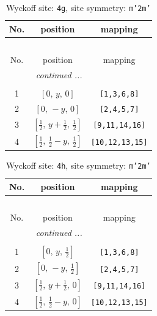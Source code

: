 \documentclass[fleqn,8pt]{jsarticle}
\begin{document}
\renewcommand{\arraystretch}{1.2}
\begin{longtable}{ccc}
\caption{Wyckoff site: {\tt 4g}, site symmetry: {\tt m'2m'}}
 \\
 \hline \hline
No. & position & mapping \\ \hline \endfirsthead

\multicolumn{2}{l}{\tablename\ \thetable{}} \\
 \hline \hline
No. & position & mapping \\ \hline \endhead

 \hline \hline
\multicolumn{2}{r}{\footnotesize\it continued ...} \\ \endfoot

 \hline \hline
\multicolumn{2}{r}{} \\ \endlastfoot

1 & $\left[ 0,\, y,\, 0 \right]$ & {\tt [1,3,6,8]} \\ \hline
2 & $\left[ 0,\, - y,\, 0 \right]$ & {\tt [2,4,5,7]} \\ \hline
3 & $\left[ \frac{1}{2},\, y + \frac{1}{2},\, \frac{1}{2} \right]$ & {\tt [9,11,14,16]} \\ \hline
4 & $\left[ \frac{1}{2},\, \frac{1}{2} - y,\, \frac{1}{2} \right]$ & {\tt [10,12,13,15]} \\
\end{longtable}
\renewcommand{\arraystretch}{1.2}
\begin{longtable}{ccc}
\caption{Wyckoff site: {\tt 4h}, site symmetry: {\tt m'2m'}}
 \\
 \hline \hline
No. & position & mapping \\ \hline \endfirsthead

\multicolumn{2}{l}{\tablename\ \thetable{}} \\
 \hline \hline
No. & position & mapping \\ \hline \endhead

 \hline \hline
\multicolumn{2}{r}{\footnotesize\it continued ...} \\ \endfoot

 \hline \hline
\multicolumn{2}{r}{} \\ \endlastfoot

1 & $\left[ 0,\, y,\, \frac{1}{2} \right]$ & {\tt [1,3,6,8]} \\ \hline
2 & $\left[ 0,\, - y,\, \frac{1}{2} \right]$ & {\tt [2,4,5,7]} \\ \hline
3 & $\left[ \frac{1}{2},\, y + \frac{1}{2},\, 0 \right]$ & {\tt [9,11,14,16]} \\ \hline
4 & $\left[ \frac{1}{2},\, \frac{1}{2} - y,\, 0 \right]$ & {\tt [10,12,13,15]} \\
\end{longtable}
\end{document}
